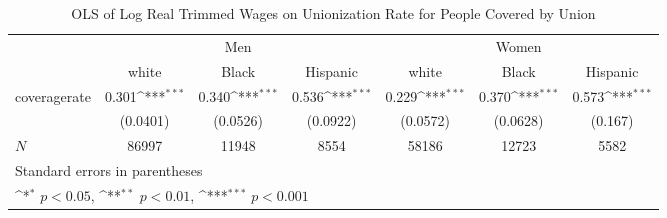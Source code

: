 \begin{table}[htbp]\centering
\def\sym#1{\ifmmode^{#1}\else\(^{#1}\)\fi}
\caption{OLS of Log Real Trimmed Wages on Unionization Rate for People Covered by Union}
\begin{tabular}{l*{6}{c}}
\hline\hline
            &\multicolumn{3}{c}{Men}                                          &\multicolumn{3}{c}{Women}                                        \\\cmidrule(lr){2-4}\cmidrule(lr){5-7}
            &\multicolumn{1}{c}{white}&\multicolumn{1}{c}{Black}&\multicolumn{1}{c}{Hispanic}&\multicolumn{1}{c}{white}&\multicolumn{1}{c}{Black}&\multicolumn{1}{c}{Hispanic}\\
\hline
coveragerate&       0.301\sym{***}&       0.340\sym{***}&       0.536\sym{***}&       0.229\sym{***}&       0.370\sym{***}&       0.573\sym{***}\\
            &    (0.0401)         &    (0.0526)         &    (0.0922)         &    (0.0572)         &    (0.0628)         &     (0.167)         \\
\hline
\(N\)       &       86997         &       11948         &        8554         &       58186         &       12723         &        5582         \\
\hline\hline
\multicolumn{7}{l}{\footnotesize Standard errors in parentheses}\\
\multicolumn{7}{l}{\footnotesize \sym{*} \(p<0.05\), \sym{**} \(p<0.01\), \sym{***} \(p<0.001\)}\\
\end{tabular}
\end{table}
